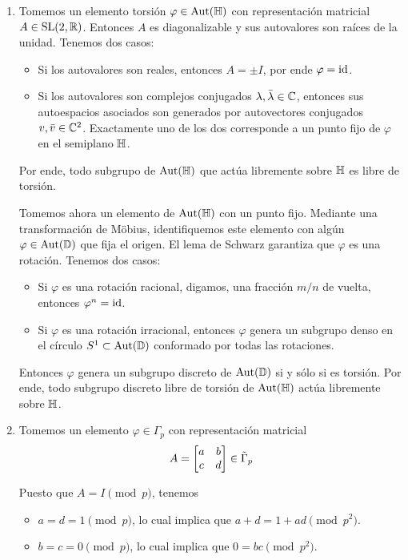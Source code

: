 \begin{solution}
\leavevmode
\begin{enumerate}[label=\alph*)]
    \item Tomemos un elemento torsión $\varphi \in \operatorname{Aut}(\mathbb H)$ con representación matricial $A \in \operatorname{SL}(2, \mathbb R)$. Entonces $A$ es diagonalizable y sus autovalores son raíces de la unidad. Tenemos dos casos:
    \begin{itemize}
        \item Si los autovalores son reales, entonces $A = \pm I$, por ende $\varphi = \operatorname{id}$.
        \item Si los autovalores son complejos conjugados $\lambda, \bar \lambda \in \mathbb C$, entonces sus autoespacios asociados son generados por autovectores conjugados $v, \bar v \in \mathbb C^2$. Exactamente uno de los dos corresponde a un punto fijo de $\varphi$ en el semiplano $\mathbb H$.
    \end{itemize}
    
    Por ende, todo subgrupo de $\operatorname{Aut}(\mathbb H)$ que actúa libremente sobre $\mathbb H$ es libre de torsión.
    
    Tomemos ahora un elemento de $\operatorname{Aut}(\mathbb H)$ con un punto fijo. Mediante una transformación de Möbius, identifiquemos este elemento con algún $\varphi \in \operatorname{Aut}(\mathbb D)$ que fija el origen. El lema de Schwarz garantiza que $\varphi$ es una rotación. Tenemos dos casos:
    \begin{itemize}
        \item Si $\varphi$ es una rotación racional, digamos, una fracción $m/n$ de vuelta, entonces $\varphi^n = \operatorname{id}$.
        \item Si $\varphi$ es una rotación irracional, entonces $\varphi$ genera un subgrupo denso en el círculo $S^1 \subset \operatorname{Aut}(\mathbb D)$ conformado por todas las rotaciones.
    \end{itemize}
    
    Entonces $\varphi$ genera un subgrupo discreto de $\operatorname{Aut}(\mathbb D)$ si y sólo si es torsión. Por ende, todo subgrupo discreto libre de torsión de $\operatorname{Aut}(\mathbb H)$ actúa libremente sobre $\mathbb H$.
    
    \item Tomemos un elemento $\varphi \in \Gamma_p$ con representación matricial
    $$A = \begin{bmatrix} a & b \\ c & d \end{bmatrix} \in \tilde \Gamma_p$$
    
    Puesto que $A = I \pmod p$, tenemos
    \begin{itemize}
        \item $a = d = 1 \pmod p$, lo cual implica que $a + d = 1 + ad \pmod {p^2}$.
        \item $b = c = 0 \pmod p$, lo cual implica que $0 = bc \pmod {p^2}$.
    \end{itemize}
    

\end{enumerate}
\end{solution}
